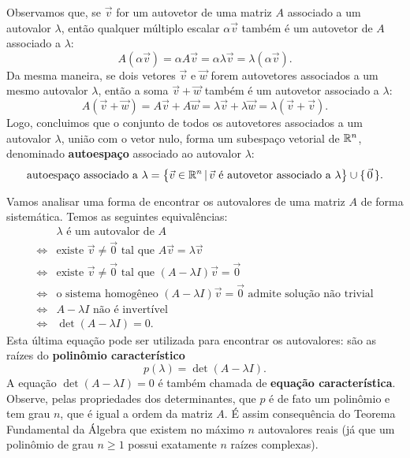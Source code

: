 \documentclass[../livro.tex]{subfiles}  %
\begin{document}
Observamos que, se $\vec{v}$ for um autovetor de uma matriz $A$ associado a um autovalor $\lambda$, então qualquer múltiplo escalar $\alpha \vec{v}$ também é um autovetor de $A$ associado a $\lambda$:
\[
A (\alpha \vec{v}) = \alpha A \vec{v} = \alpha \lambda \vec{v} = \lambda (\alpha \vec{v}).
\] Da mesma maneira, se dois vetores $\vec{v}$ e $\vec{w}$ forem autovetores associados a um mesmo autovalor $\lambda$, então a soma $\vec{v} + \vec{w}$ também é um autovetor associado a $\lambda$:
\[
A (\vec{v} + \vec{w}) = A \vec{v} + A \vec{w} =  \lambda \vec{v} + \lambda \vec{w} = \lambda (\vec{v} + \vec{v}).
\] Logo, concluimos que o conjunto de todos os autovetores associados a um autovalor $\lambda$, união com o vetor nulo, forma um subespaço vetorial de $\mathbb{R}^n$, denominado \textbf{autoespaço} associado ao autovalor $\lambda$:
\[
\text{autoespaço associado a } \lambda = \big\{ \vec{v} \in \mathbb{R}^n \, | \, \vec{v} \text{ é autovetor associado a } \lambda \big\} \cup \{\, \vec{0}\, \}.
\]

Vamos analisar uma forma de encontrar os autovalores de uma matriz $A$ de forma sistemática. Temos as seguintes equivalências:
\begin{align*}
& \lambda \text{ é um autovalor de $A$} \\
\iff & \text{existe } \vec{v} \neq \vec{0} \text{ tal que } A \vec{v} = \lambda \vec{v} \\
\iff & \text{existe } \vec{v} \neq \vec{0} \text{ tal que } (A - \lambda I)\vec{v} = \vec{0} \\
\iff & \text{o sistema homogêneo } (A - \lambda I)\vec{v} = \vec{0} \text{ admite solução não trivial} \\
\iff & A - \lambda I \text{ não é invertível} \\
\iff & \det (A - \lambda I) = 0.
\end{align*}
Esta última equação pode ser utilizada para encontrar os autovalores: são as raízes do \textbf{polinômio característico}
\[
p(\lambda) = \det (A - \lambda I).
\] A equação $\det (A - \lambda I) = 0$ é também chamada de \textbf{equação característica}. Observe, pelas propriedades dos determinantes, que $p$ é de fato um polinômio e tem grau $n$, que é igual a ordem da matriz $A$. É assim consequência do Teorema Fundamental da Álgebra que existem no máximo $n$ autovalores reais (já que um polinômio de grau $n\ge 1$ possui exatamente $n$ raízes complexas).
\end{document}
